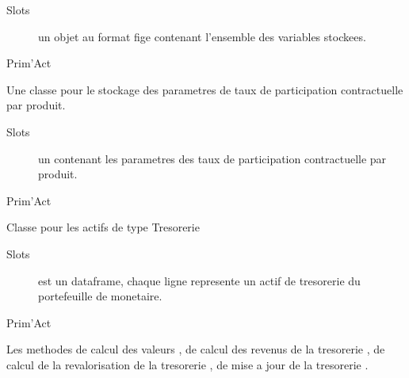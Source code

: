 \documentclass[a4paper]{book}
\begin{document}
%
\begin{Section}{Slots}

\begin{description}

\item[] un objet  au format fige contenant l'ensemble des variables stockees.

\end{description}
\end{Section}
%
\begin{Author}\relax
Prim'Act
\end{Author}
%
\begin{Description}\relax
Une classe pour le stockage des parametres de taux de participation contractuelle par produit.
\end{Description}
%
\begin{Section}{Slots}

\begin{description}

\item[] un  contenant les parametres des taux de participation contractuelle par produit.

\end{description}
\end{Section}
%
\begin{Author}\relax
Prim'Act
\end{Author}
%
\begin{Description}\relax
Classe pour les actifs de type Tresorerie
\end{Description}
%
\begin{Section}{Slots}

\begin{description}

\item[] est un dataframe, chaque ligne represente un actif de tresorerie du portefeuille de monetaire.

\end{description}
\end{Section}
%
\begin{Author}\relax
Prim'Act
\end{Author}
%
\begin{SeeAlso}\relax
Les methodes de calcul des valeurs , 
de calcul des revenus de la tresorerie , 
de calcul de la revalorisation de la tresorerie ,
de mise a jour de la tresorerie .
\end{SeeAlso}
\end{document}
